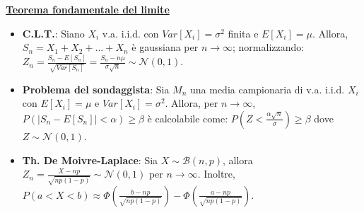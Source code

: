 \documentclass[8pt]{extarticle}
\begin{document}
\begin{multicols*}{3}
    \textbf{\underline{Teorema fondamentale del limite}}
    \begin{itemize}
        \item \textbf{C.L.T.}: Siano $X_{i}$ v.a. i.i.d. con $Var[X_{i}]=\sigma^{2}$ finita e $E[X_{i}]=\mu$. Allora, $S_{n}=X_{1}+X_{2}+...+X_{n}$ è gaussiana per $n\rightarrow\infty$; normalizzando: $Z_{n}=\frac{S_{n}-E[S_{n}]}{\sqrt{Var[S_{n}]}}=\frac{S_{n}-n\mu}{\sigma\sqrt{n}}\sim\mathcal{N}(0,1)$.
        \item \textbf{Problema del sondaggista}: Sia $M_{n}$ una media campionaria di v.a. i.i.d. $X_{i}$ con $E[X_{i}]=\mu$ e $Var[X_{i}]=\sigma^{2}$. Allora, per $n\rightarrow\infty$, $P(|S_{n}-E[S_{n}]|<\alpha)\ge\beta$ è calcolabile come: $P\left(Z<\frac{\alpha\sqrt{n}}{\sigma}\right)\ge\beta$ dove $Z\sim\mathcal{N}(0,1)$.
        \item \textbf{Th. De Moivre-Laplace}: Sia $X\sim\mathcal{B}(n,p)$, allora $Z_{n}=\frac{X-np}{\sqrt{np(1-p)}}\sim\mathcal{N}(0,1)$ per $n\rightarrow\infty$. Inoltre, $P(a<X<b)\approx\Phi\left(\frac{b-np}{\sqrt{np(1-p)}}\right)-\Phi\left(\frac{a-np}{\sqrt{np(1-p)}}\right)$.
    \end{itemize}


\end{multicols*}
\end{document}
